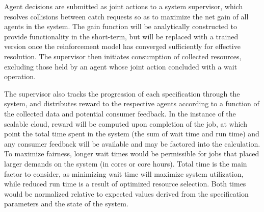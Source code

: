 \documentclass{article}
\theoremstyle{definition}
\theoremstyle{remark}
\begin{document}
	\indent
	
	Agent decisions are submitted as joint actions to a system supervisor, which resolves collisions between catch requests so as to maximize the net gain of all agents in the system. The gain function will be analytically constructed to provide functionality in the short-term, but will be replaced with a trained version once the reinforcement model has converged sufficiently for effective resolution. The supervisor then initiates consumption of collected resources, excluding those held by an agent whose joint action concluded with a wait operation.
	
	The supervisor also tracks the progression of each specification through the system, and distributes reward to the respective agents according to a function of the collected data and potential consumer feedback. In the instance of the scalable cloud, reward will be computed upon completion of the job, at which point the total time spent in the system (the sum of wait time and run time) and any consumer feedback will be available and may be factored into the calculation. To maximize fairness, longer wait times would be permissible for jobs that placed larger demands on the system (in cores or core hours). Total time is the main factor to consider, as minimizing wait time will maximize system utilization, while reduced run time is a result of optimized resource selection. Both times would be normalized relative to expected values derived from the specification parameters and the state of the system.
	
	\newpage    
\end{document}
